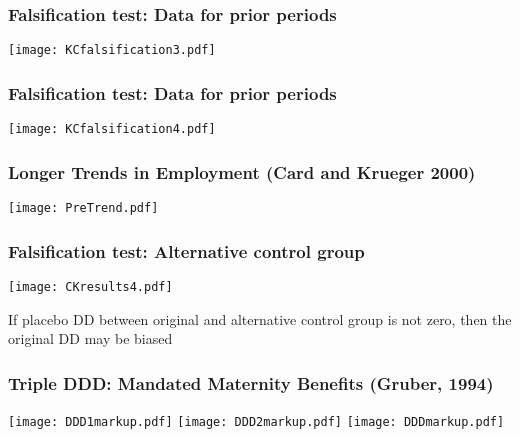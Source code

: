 \documentclass{beamer}
\numberwithin{equation}{section}
\begin{document}
\begin{frame}
  \frametitle{Falsification test: Data for prior periods}
  \vspace{-.2in}
\begin{center}
  \texttt{[image: KCfalsification3.pdf]}
\end{center}
\end{frame}

\begin{frame}
  \frametitle{Falsification test: Data for prior periods}
  \vspace{-.2in}
\begin{center}
  \texttt{[image: KCfalsification4.pdf]}
\end{center}
\end{frame}

\begin{frame}
  \frametitle{Longer Trends in Employment (Card and Krueger 2000)}
  \vspace{-.1in}
\begin{center}
  \texttt{[image: PreTrend.pdf]}
\end{center}
\end{frame}


\begin{frame}
  \frametitle{Falsification test: Alternative control group}
  \vspace{-.2in}
\begin{center}
  \texttt{[image: CKresults4.pdf]}
\end{center}
If placebo DD between original and alternative control group is not zero, then the original DD may be biased
\end{frame}


\begin{frame}
  \frametitle{Triple DDD: Mandated Maternity Benefits (Gruber, 1994)}
\hspace*{0.5cm}\begin{overprint}
\texttt{[image: DDD1markup.pdf]}
\texttt{[image: DDD2markup.pdf]}
\texttt{[image: DDDmarkup.pdf]}
\end{overprint}
\end{frame}
\end{document}
